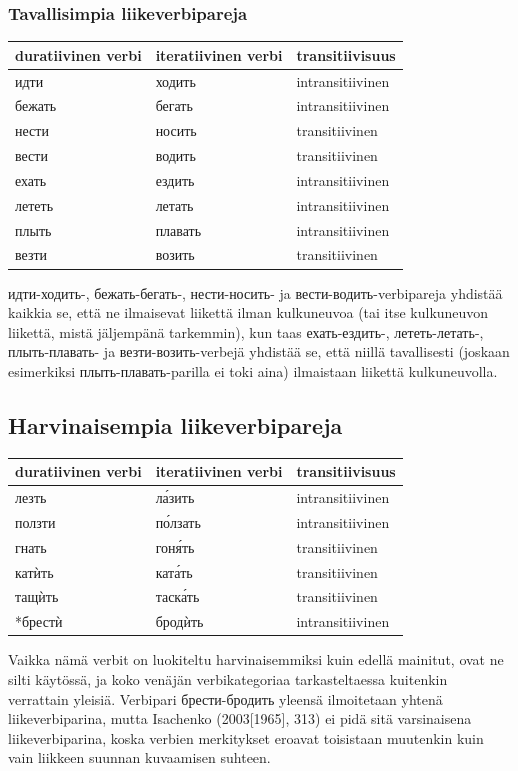 \documentclass[]{scrartcl}
\begin{document}
\subsubsection{Tavallisimpia
liikeverbipareja}\label{tavallisimpia-liikeverbipareja}

\begin{longtable}[c]{@{}lll@{}}
\toprule
duratiivinen verbi & iteratiivinen verbi &
transitiivisuus\tabularnewline
\midrule
\endhead
идти & ходить & intransitiivinen\tabularnewline
бежать & бегать & intransitiivinen\tabularnewline
нести & носить & transitiivinen\tabularnewline
вести & водить & transitiivinen\tabularnewline
ехать & ездить & intransitiivinen\tabularnewline
лететь & летать & intransitiivinen\tabularnewline
плыть & плавать & intransitiivinen\tabularnewline
везти & возить & transitiivinen\tabularnewline
\bottomrule
\end{longtable}

идти-ходить-, бежать-бегать-, нести-носить- ja вести-водить-verbipareja
yhdistää kaikkia se, että ne ilmaisevat liikettä ilman kulkuneuvoa (tai
itse kulkuneuvon liikettä, mistä jäljempänä tarkemmin), kun taas
ехать-ездить-, лететь-летать-, плыть-плавать- ja везти-возить-verbejä
yhdistää se, että niillä tavallisesti (joskaan esimerkiksi
плыть-плавать-parilla ei toki aina) ilmaistaan liikettä kulkuneuvolla.

\subsection{Harvinaisempia
liikeverbipareja}\label{harvinaisempia-liikeverbipareja}

\begin{longtable}[c]{@{}lll@{}}
\toprule
duratiivinen verbi & iteratiivinen verbi &
transitiivisuus\tabularnewline
\midrule
\endhead
лезть & ла́зить & intransitiivinen\tabularnewline
ползти & по́лзать & intransitiivinen\tabularnewline
гнать & гоня́ть & transitiivinen\tabularnewline
катѝть & ката́ть & transitiivinen\tabularnewline
тащѝть & таска́ть & transitiivinen\tabularnewline
*брестѝ & бродѝть & intransitiivinen\tabularnewline
\bottomrule
\end{longtable}

Vaikka nämä verbit on luokiteltu harvinaisemmiksi kuin edellä mainitut,
ovat ne silti käytössä, ja koko venäjän verbikategoriaa tarkasteltaessa
kuitenkin verrattain yleisiä. Verbipari брести-бродить yleensä
ilmoitetaan yhtenä liikeverbiparina, mutta Isachenko (2003{[}1965{]},
313) ei pidä sitä varsinaisena liikeverbiparina, koska verbien
merkitykset eroavat toisistaan muutenkin kuin vain liikkeen suunnan
kuvaamisen suhteen.
\end{document}
